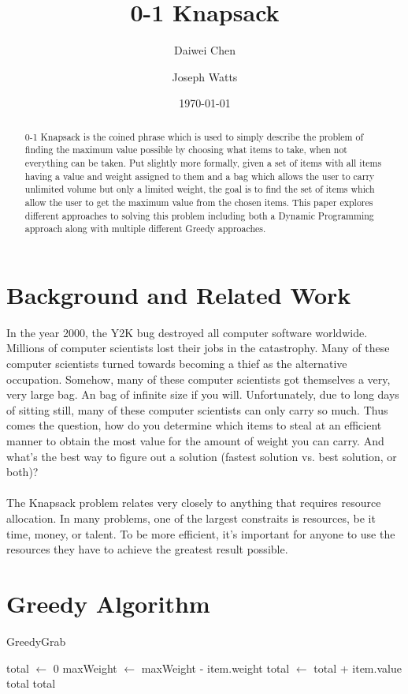 \documentclass[10pt, letterpaper]{article}
\title{0-1 Knapsack}
\author{Daiwei Chen \and Joseph Watts}
\date{\today}
\begin{document}
\maketitle
\begin{abstract}
	0-1 Knapsack is the coined phrase which is used to simply describe the problem of finding the maximum value possible by choosing what items to take, when not everything can be taken.
 Put slightly more formally, given a set of items with all items having a value and weight assigned to them and a bag which allows the user to carry unlimited volume but only a limited weight, the goal is to find the set of items which allow the user to get the maximum value from the chosen items.
This paper explores different approaches to solving this problem including both a Dynamic Programming approach along with multiple different Greedy approaches.

\end{abstract}

\section{Background and Related Work}
In the year 2000, the Y2K bug destroyed all computer software worldwide. Millions of computer scientists lost their jobs in the catastrophy. Many of these computer scientists turned towards becoming a thief as the alternative occupation. Somehow, many of these computer scientists got themselves a very, very large bag. An bag of infinite size if you will. Unfortunately, due to long days of sitting still, many of these computer scientists can only carry so much. Thus comes the question, how do you determine which items to steal at an efficient manner to obtain the most value for the amount of weight you can carry. And what's the best way to figure out a solution (fastest solution vs. best solution, or both)?\\
\\
The Knapsack problem relates very closely to anything that requires resource allocation. In many problems, one of the largest constraits is resources, be it time, money, or talent. To be more efficient, it's important for anyone to use the resources they have to achieve the greatest result possible.

\section{Greedy Algorithm}

\begin{algorithm}
  \begin{algorithmic}
    \caption{GreedyGrab}\label{GreedyGrab}
    \State total $\gets$ 0
    \State maxWeight $\gets$ maxWeight - item.weight
    \State total $\gets$ total + item.value
    \EndIf
    \Return total
    \EndIf
    \Return total
    \EndFunction
  \end{algorithmic}
\end{algorithm}
\end{document}

